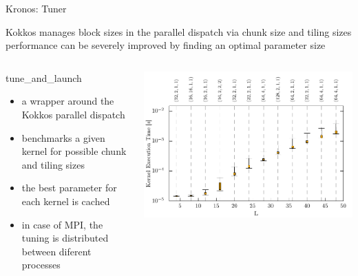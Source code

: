 \begin{frame}{Kronos: Tuner}

  Kokkos manages block sizes in the parallel dispatch via chunk size and tiling sizes\\

  performance can be severely improved by finding an optimal parameter size \\

  \begin{columns}
      \begin{block}{tune\_and\_launch}
        \begin{itemize}
          \item a wrapper around the Kokkos parallel dispatch
          \item benchmarks a given kernel for possible chunk and tiling sizes
          \item the best parameter for each kernel is cached
          \item in case of MPI, the tuning is distributed between diferent processes
        \end{itemize}
      \end{block}
      \includegraphics[width=\textwidth]{figs/tiling_distr_L_boxplot_v2.pdf}
  \end{columns}

\end{frame}

